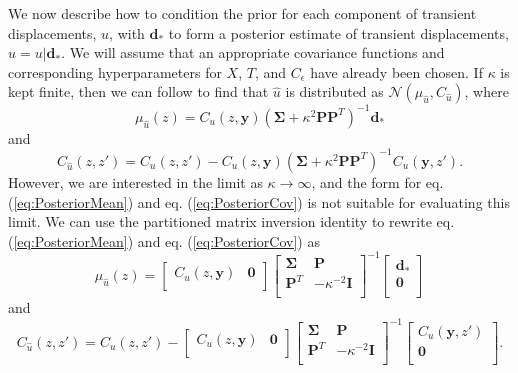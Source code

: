 \documentclass[10pt,a4paper]{article}
\begin{document}
We now describe how to condition the prior for each component of transient displacements, $u$, with $\bm{d}_*$ to form a posterior estimate of transient displacements, $\hat{u} = u | \bm{d}_*$. We will assume that an appropriate covariance functions and corresponding hyperparameters for $X$, $T$, and $C_\epsilon$ have already been chosen. If $\kappa$ is kept finite, then we can follow \citet{Rasmussen2006} to find that $\hat{u}$ is distributed as $\mathcal{N}(\mu_{\hat{u}},C_{\hat{u}})$, where
\begin{equation}\label{eq:PosteriorMean}
\mu_{\hat{u}}(z) = C_u(z,\bm{y})\left(\bm{\Sigma} + \kappa^2\bm{P}\bm{P}^T\right)^{-1}\bm{d}_*
\end{equation}    
and
\begin{equation}\label{eq:PosteriorCov}
C_{\hat{u}}(z,z') = C_u(z,z') - C_u(z,\bm{y})\left(\bm{\Sigma} + \kappa^2\bm{P}\bm{P}^T\right)^{-1}C_u(\bm{y},z').
\end{equation}
However, we are interested in the limit as $\kappa \to \infty$, and the form for eq. (\ref{eq:PosteriorMean}) and eq. (\ref{eq:PosteriorCov}) is not suitable for evaluating this limit. We can use the partitioned matrix inversion identity \citep[e.g.,][]{Press2007} to rewrite eq. (\ref{eq:PosteriorMean}) and eq. (\ref{eq:PosteriorCov}) as
 \begin{equation}\label{eq:PosteriorMean2}
\mu_{\hat{u}}(z) =
\left[ 
\begin{array}{cc}
C_u(z,\bm{y}) & \bm{0} \\
\end{array}
\right]
\left[
\begin{array}{cc}
\bm{\Sigma} & \bm{P} \\
\bm{P}^T  & -\kappa^{-2} \bm{I} \\
\end{array}
\right]^{-1}
\left[
\begin{array}{c}
\bm{d}_* \\
\bm{0} \\
\end{array}
\right]
\end{equation}    
and
\begin{equation}\label{eq:PosteriorCov2}
C_{\hat{u}}(z,z') = 
C_u(z,z') - 
\left[ 
\begin{array}{cc}
C_u(z,\bm{y}) & \bm{0} \\
\end{array}
\right]
\left[
\begin{array}{cc}
\bm{\Sigma} & \bm{P} \\
\bm{P}^T  & -\kappa^{-2} \bm{I} \\
\end{array}
\right]^{-1}
\left[
\begin{array}{c}
C_u(\bm{y},z') \\
\bm{0} \\
\end{array}
\right].
\end{equation}
\end{document}
